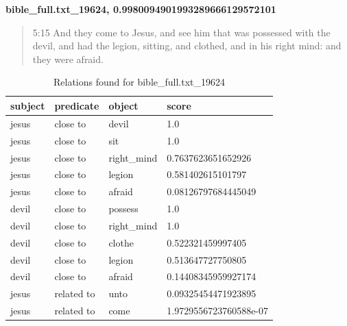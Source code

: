 \clearpage
\textbf{bible\_full.txt\_19624, 0.9980094901993289666129572101}\\
\blockquote{
5:15 And they come to Jesus, and see him that was possessed with the devil, and had the legion, sitting, and clothed, and in his right mind: and they were afraid.}
\begin{table}[H]
\centering
    \begin{tabular}{|l|l|l|l|}
    \hline
    subject & predicate & object & score \\
    \hline
    jesus & close to & devil & 1.0\\
    jesus &close to& sit & 1.0\\
    jesus &close to& right\_mind &0.7637623651652926\\
    jesus &close to& legion & 0.581402615101797\\
    jesus &close to& afraid & 0.08126797684445049\\
    \hline
    devil &close to& possess & 1.0\\
    devil &close to& right\_mind & 1.0\\
    devil &close to& clothe &	0.522321459997405\\
    devil &close to& legion & 0.513647727750805\\
    devil &close to& afraid & 0.14408345959927174\\
    \hline
    jesus & related to & unto & 0.09325454471923895 \\
    jesus &related to & come & 1.9729556723760588e-07 \\
    \hline
\end{tabular}
\caption{Relations found for bible\_full.txt\_19624}
\label{tab:relations_jesus,devil_19624}
\end{table}

